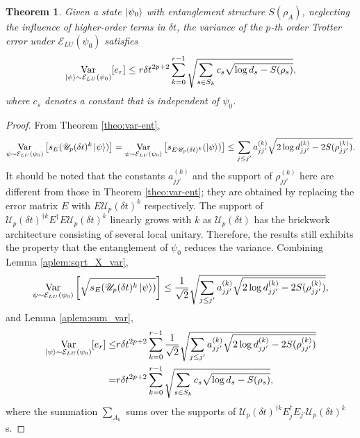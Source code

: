 \documentclass[showpacs,amsmath,amssymb,twocolumn,aps,pra,superscriptaddress,notitlepage,10pt]{revtex4-2}
\newcommand{\cE}{\mathcal E_{LU}}
\newcommand{\sU}{\mathscr U}
\newcommand{\kp}{\ket{\psi}}
\newtheorem{theorem}{Theorem}
\begin{document}
\begin{theorem}
    Given a state $\ket{\psi_0}$ with entanglement structure $S(\rho_A)$, neglecting the influence of higher-order terms in $\delta t$, the variance of the $p$-th order Trotter error under $\cE(\psi_0)$ satisfies
    \begin{equation}
        \mathop{\operatorname{Var}}_{\kp\sim\cE(\psi_0)}[e_r]\le r\delta t^{2p+2}\sum_{k=0}^{r-1}\sqrt{\sum_{s\in S_k}c_{s}\sqrt{\log d_{s}-S(\rho_{s})}},
    \end{equation}
    where $c_s$ denotes a constant that is independent of $\psi_0$.
\end{theorem}
\begin{proof}
    From Theorem \ref{theo:var-ent},
    \begin{equation}
    \mathop{\operatorname{Var}}_{\psi\sim\cE(\psi_0)}\left[{s_E(\sU_p(\delta t)^k\ket{\psi})}\right]=\mathop{\operatorname{Var}}_{\psi\sim\cE(\psi_0)}\left[{s_{E\sU_p(\delta t)^k}(\ket{\psi})}\right]\le\sum_{j\le j'}a^{(k)}_{jj'}\sqrt{2\log{d^{(k)}_{jj'}}-2S(\rho^{(k)}_{jj'})}.
    \end{equation}
    It should be noted that the constants $a_{jj'}^{(k)}$ and the support of $\rho_{jj'}^{(k)}$ here are different from those in Theorem \ref{theo:var-ent}; they are obtained by replacing the error matrix $E$ with $E\sU_p(\delta t)^k$ respectively. The support of $\sU_p(\delta t)^{\dagger k}E^\dagger E\sU_p(\delta t)^k$ linearly grows with $k$ as $\sU_p(\delta t)$ has the brickwork architecture consisting of several local unitary. Therefore, the results still exhibits the property that the entanglement of $\psi_0$ reduces the variance. Combining Lemma \ref{aplem:sqrt_X_var},
    \begin{equation}
        \mathop{\operatorname{Var}}_{\psi\sim\cE(\psi_0)}\left[\sqrt{s_E(\sU_p(\delta t)^k\ket{\psi})}\right]\le\frac{1}{\sqrt 2}\sqrt{\sum_{j\le j'}a^{(k)}_{jj'}\sqrt{2\log{d^{(k)}_{jj'}}-2S(\rho^{(k)}_{jj'})}},
    \end{equation}
    and Lemma \ref{aplem:sum_var},
    \begin{align}
        \mathop{\operatorname{Var}}_{\kp\sim\cE(\psi_0)}[e_r]\le &r\delta t^{2p+2}\sum_{k=0}^{r-1}\frac{1}{\sqrt 2}\sqrt{\sum_{j\le j'}a^{(k)}_{jj'}\sqrt{2\log{d^{(k)}_{jj'}}-2S(\rho^{(k)}_{jj'})}}\\
        =&r\delta t^{2p+2}\sum_{k=0}^{r-1}\sqrt{\sum_{s\in S_k}c_s\sqrt{\log d_{s}-S(\rho_{s})}},
    \end{align}
    where the summation $\sum_{A_k}$ sums over the supports of $\sU_p(\delta t)^{\dagger k}E_j^\dagger E_{j'}\sU_p(\delta t)^k$s.
\end{proof}

\clearpage
\end{document}
